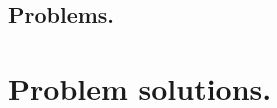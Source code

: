 \documentclass[ twoside,openright,titlepage,numbers=noenddot,headinclude,
                footinclude=true,cleardoublepage=empty,abstractoff,
                BCOR=5mm,
                paper=6in:9in,
                fontsize=11pt,
                floatperchapter,
                ngerman,american,
                ]{scrreprt}
\begin{document}
      \subsection{Problems.}
         
%      
%      
%         
%         
%      
%      
%      
%      
%      
%      
%      
   \section{Problem solutions.}
      \shipoutAnswer
%
\end{document}
